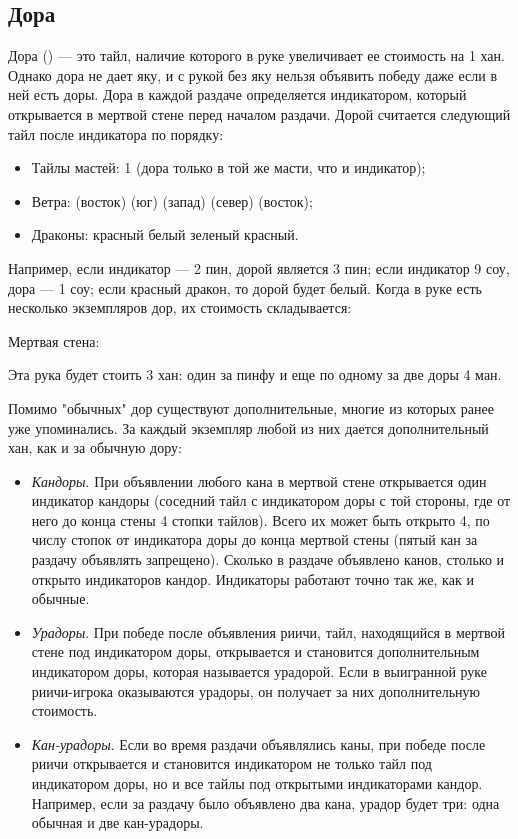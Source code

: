 \subsection{Дора}

Дора () --- это тайл, наличие которого в руке увеличивает ее стоимость на 1 хан. Однако дора не дает яку, и с рукой без яку нельзя объявить победу даже если в ней есть доры. Дора в каждой раздаче определяется индикатором, который открывается в мертвой стене перед началом раздачи. Дорой считается следующий тайл после индикатора по порядку:
\begin{itemize}
	\item Тайлы мастей: 1 (дора только в той же масти, что и индикатор);
	\item Ветра:  (восток)\rightarrow
	 (юг)\rightarrow
	 (запад)\rightarrow
	 (север)\rightarrow
	 (восток);
	\item Драконы: красный\rightarrow
	белый\rightarrow
	зеленый\rightarrow
	красный.
\end{itemize}

Например, если индикатор --- 2 пин, дорой является 3 пин; если индикатор 9 соу, дора --- 1 соу; если красный дракон, то дорой будет белый.
Когда в руке есть несколько экземпляров дор, их стоимость складывается:


Мертвая стена:

Эта рука будет стоить 3 хан: один за пинфу и еще по одному за две доры 4 ман.

Помимо "обычных" дор существуют дополнительные, многие из которых ранее уже упоминались. За каждый экземпляр любой из них дается дополнительный хан, как и за обычную дору:
\begin{itemize}
	\item \textit{Кандоры}. При объявлении любого кана в мертвой стене открывается один индикатор кандоры (соседний тайл с индикатором доры с той стороны, где от него до конца стены 4 стопки тайлов). Всего их может быть открыто 4, по числу стопок от индикатора доры до конца мертвой стены (пятый кан за раздачу объявлять запрещено). Сколько в раздаче объявлено канов, столько и открыто индикаторов кандор. Индикаторы работают точно так же, как и обычные.
	\item \textit{Урадоры}. При победе после объявления риичи, тайл, находящийся в мертвой стене под индикатором доры, открывается и становится дополнительным индикатором доры, которая называется урадорой. Если в выигранной руке риичи-игрока оказываются урадоры, он получает за них дополнительную стоимость.
	\item \textit{Кан-урадоры}. Если во время раздачи объявлялись каны, при победе после риичи открывается и становится индикатором не только тайл под индикатором доры, но и все тайлы под открытыми индикаторами кандор. Например, если за раздачу было объявлено два кана, урадор будет три: одна обычная и две кан-урадоры.
\end{itemize}

